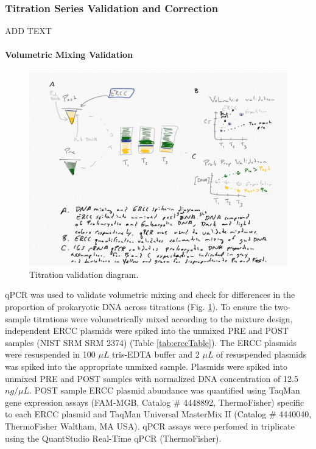 \documentclass[linenumbers]{bmcart}
\begin{document}
\subsubsection*{Titration Series Validation and Correction}
ADD TEXT

\paragraph*{Volumetric Mixing Validation}
\begin{figure}
\centering
\includegraphics{titration_validation.png}
\caption{\label{fig:titrationValidation} Titration validation diagram.}
\end{figure}

qPCR was used to validate volumetric mixing and check for differences in
the proportion of prokaryotic DNA across titrations (Fig. \ref{fig:titrationValidation}). To ensure the
two-sample titrations were volumetrically mixed according to the mixture
design, independent ERCC plasmids were spiked into the unmixed PRE and
POST samples \cite{baker2005external} (NIST SRM SRM 2374) (Table
\ref{tab:erccTable}). The ERCC plasmids were resuspended in 100
\(\mu L\) tris-EDTA buffer and 2 \(\mu L\) of resuspended plasmids was
spiked into the appropriate unmixed sample. Plasmids were spiked into
unmixed PRE and POST samples with normalized DNA concentration of
12.5 \(ng/\mu L\). POST sample ERCC plasmid abundance was quantified
using TaqMan gene expression assays (FAM-MGB, Catalog \# 4448892,
ThermoFisher) specific to each ERCC plasmid and TaqMan Universal
MasterMix II (Catalog \# 4440040, ThermoFisher Waltham, MA USA).
qPCR assays were perfomed in triplicate using the QuantStudio
Real-Time qPCR (ThermoFisher).
\end{document}
